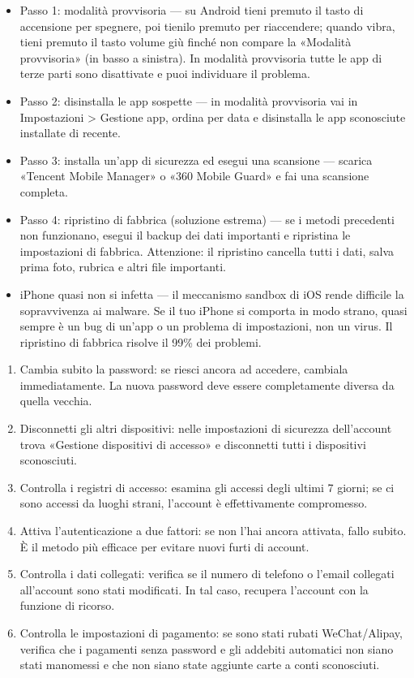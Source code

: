 \begin{itemize}
  \item Passo 1: modalità provvisoria — su Android tieni premuto il tasto di accensione per spegnere, poi tienilo premuto per riaccendere; quando vibra, tieni premuto il tasto volume giù finché non compare la «Modalità provvisoria» (in basso a sinistra). In modalità provvisoria tutte le app di terze parti sono disattivate e puoi individuare il problema.
  \item Passo 2: disinstalla le app sospette — in modalità provvisoria vai in Impostazioni > Gestione app, ordina per data e disinstalla le app sconosciute installate di recente.
  \item Passo 3: installa un'app di sicurezza ed esegui una scansione — scarica «Tencent Mobile Manager» o «360 Mobile Guard» e fai una scansione completa.
  \item Passo 4: ripristino di fabbrica (soluzione estrema) — se i metodi precedenti non funzionano, esegui il backup dei dati importanti e ripristina le impostazioni di fabbrica. Attenzione: il ripristino cancella tutti i dati, salva prima foto, rubrica e altri file importanti.
  \item iPhone quasi non si infetta — il meccanismo sandbox di iOS rende difficile la sopravvivenza ai malware. Se il tuo iPhone si comporta in modo strano, quasi sempre è un bug di un'app o un problema di impostazioni, non un virus. Il ripristino di fabbrica risolve il 99\% dei problemi.
\end{itemize}


\begin{enumerate}
  \item Cambia subito la password: se riesci ancora ad accedere, cambiala immediatamente. La nuova password deve essere completamente diversa da quella vecchia.
  \item Disconnetti gli altri dispositivi: nelle impostazioni di sicurezza dell'account trova «Gestione dispositivi di accesso» e disconnetti tutti i dispositivi sconosciuti.
  \item Controlla i registri di accesso: esamina gli accessi degli ultimi 7 giorni; se ci sono accessi da luoghi strani, l'account è effettivamente compromesso.
  \item Attiva l'autenticazione a due fattori: se non l'hai ancora attivata, fallo subito. È il metodo più efficace per evitare nuovi furti di account.
  \item Controlla i dati collegati: verifica se il numero di telefono o l'email collegati all'account sono stati modificati. In tal caso, recupera l'account con la funzione di ricorso.
  \item Controlla le impostazioni di pagamento: se sono stati rubati WeChat/Alipay, verifica che i pagamenti senza password e gli addebiti automatici non siano stati manomessi e che non siano state aggiunte carte a conti sconosciuti.
\end{enumerate}


